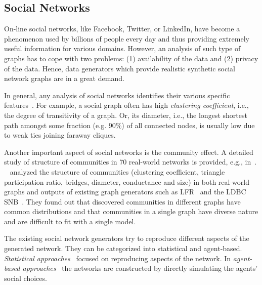 \subsection{Social Networks}
\label{sec:generators_socialnetworks}

On-line social networks, like Facebook, Twitter, or LinkedIn, have become a
phenomenon used by billions of people every day and thus providing extremely
useful information for various domains. However, an analysis of such type of
graphs has to cope with two problems: (1) availability of the data and (2)
privacy of the data. Hence, data generators which provide realistic synthetic
social network graphs are in a great demand.

In general, any analysis of social networks identifies their various specific
features~\cite{Chakrabarti:2006:GML:1132952.1132954}. For example, a social
graph often has high \emph{clustering coefficient}, i.e., the degree of
transitivity of a graph. Or, its diameter, i.e., the longest shortest path
amongst some fraction (e.g. 90\%) of all connected nodes, is usually low due to
weak ties joining faraway cliques.

Another important aspect of social networks is the community effect. A detailed
study of structure of communities in 70 real-world networks is provided, e.g.,
in~\cite{Leskovec:2008:SPC:1367497.1367591}.
~\cite{Prat-Perez:2014:CSS:2621934.2621942} analyzed the structure of
communities (clustering coefficient, triangle participation ratio, bridges,
diameter, conductance and size) in both real-world graphs and outputs of
existing graph generators such as LFR~\cite{PhysRevE.78.046110} and the
LDBC SNB~\cite{Erling:2015:LSN:2723372.2742786}. They found out that discovered
communities  in different graphs have common distributions and that communities
in a single graph have diverse nature and are difficult to fit with a single
model.

The existing social network generators try to reproduce different aspects of the
generated network. They can be categorized into statistical and agent-based.
\emph{Statistical
approaches}~\cite{PhysRevE.78.046110,Yao2011,Armstrong:2013:LDB:2463676.2465296,Pham2013,Sukthankar-SocialInfo2014,Erling:2015:LSN:2723372.2742786,Nettleton2016}
focused on reproducing aspects of the network. In \emph{agent-based
approaches}~\cite{Barrett:2009:GAL:1995456.1995598,Bernstein:2013:SAS:2499604.2499609}
the networks are constructed by directly simulating the agents' social choices.

